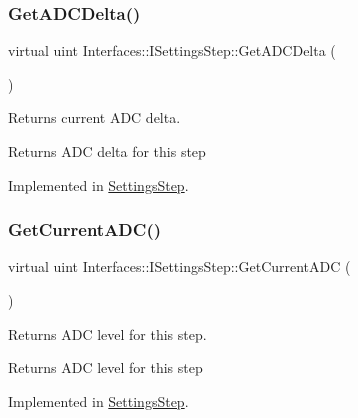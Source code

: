 \subsubsection{\texorpdfstring{Get\+A\+D\+C\+Delta()}{GetADCDelta()}}
{\footnotesize\ttfamily virtual uint Interfaces\+::\+I\+Settings\+Step\+::\+Get\+A\+D\+C\+Delta (\begin{DoxyParamCaption}{ }\end{DoxyParamCaption})\hspace{0.3cm}{\ttfamily [pure virtual]}}



Returns current A\+DC delta. 

\begin{DoxyReturn}{Returns}
A\+DC delta for this step 
\end{DoxyReturn}


Implemented in \hyperlink{class_settings_step_aee30aaa97692d6b546e9dd002900f52e}{Settings\+Step}.

\mbox{\label{class_interfaces_1_1_i_settings_step_a54d5ce3350791e080bcb75d472376abf}} 
\subsubsection{\texorpdfstring{Get\+Current\+A\+D\+C()}{GetCurrentADC()}}
{\footnotesize\ttfamily virtual uint Interfaces\+::\+I\+Settings\+Step\+::\+Get\+Current\+A\+DC (\begin{DoxyParamCaption}{ }\end{DoxyParamCaption})\hspace{0.3cm}{\ttfamily [pure virtual]}}



Returns A\+DC level for this step. 

\begin{DoxyReturn}{Returns}
A\+DC level for this step 
\end{DoxyReturn}


Implemented in \hyperlink{class_settings_step_a443f5643d9b547632c261c5f3a4288f1}{Settings\+Step}.

\mbox{\label{class_interfaces_1_1_i_settings_step_ac2b2370bf70fb09a9e1da4db922e8903}} 
